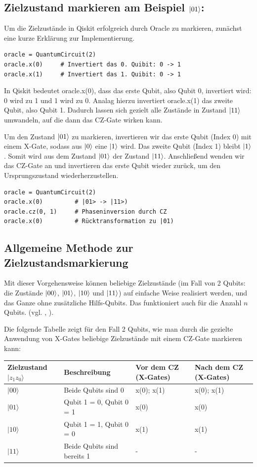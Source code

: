 \subsection*{Zielzustand markieren am Beispiel $\ket{01}$:}
Um die Zielzustände in Qiskit erfolgreich durch Oracle zu markieren, zunächst eine kurze Erklärung zur Implementierung. 
\begin{verbatim}
oracle = QuantumCircuit(2)
oracle.x(0)     # Invertiert das 0. Quibit: 0 -> 1
oracle.x(1)     # Invertiert das 1. Quibit: 0 -> 1
\end{verbatim}
In Qiskit bedeutet oracle.x(0), dass das erste Qubit, also Qubit 0, invertiert wird: 0 wird zu 1 und 1 wird zu 0. Analag hierzu invertiert oracle.x(1) das zweite Qubit, also Qubit 1. Dadurch lassen sich gezielt alle Zustände in Zustand $\ket{11}$ umwandeln, auf die dann das CZ-Gate wirken kann. 


Um den Zustand $\ket{01}$ zu markieren, invertieren wir das erste Qubit (Index 0) mit einem X-Gate, sodass aus $\ket{0}$ eine $\ket{1}$ wird. Das zweite Qubit (Index 1) bleibt $\ket{1}$. Somit wird aus dem Zustand $\ket{01}$ der Zustand $\ket{11}$. Anschließend wenden wir das CZ-Gate an und invertieren das erste Qubit wieder zurück, um den Ursprungszustand wiederherzustellen.
\begin{verbatim}
oracle = QuantumCircuit(2)
oracle.x(0)         # |01> -> |11>)
oracle.cz(0, 1)     # Phaseninversion durch CZ
oracle.x(0)         # Rücktransformation zu |01)
\end{verbatim}

\subsection*{Allgemeine Methode zur Zielzustandsmarkierung}
Mit dieser Vorgehensweise können beliebige Zielzustände (im Fall von 2 Qubits: die Zustände $\ket{00}$, $\ket{01}$, $\ket{10}$ und $\ket{11}$) auf einfache Weise realisiert werden, und das Ganze ohne zusätzliche Hilfs-Qubits. Das funktioniert auch für die Anzahl $n$ Qubits. 
(vgl. \citeauthor{roy_deterministic_2022}, \citeyear{roy_deterministic_2022}). 

Die folgende Tabelle zeigt für den Fall 2  Qubits, wie man durch die gezielte Anwendung von X-Gates beliebige Zielzustände mit einem CZ-Gate markieren kann:

\begin{tabular}{|l|l|l|l|}
\hline
Zielzustand $|z_1 z_0\rangle$ & Beschreibung & Vor dem CZ (X-Gates) & Nach dem CZ (X-Gates) \\
\hline
$|00\rangle$ & Beide Qubits sind 0 & x(0); x(1) & x(0); x(1) \\
\hline
$|01\rangle$ & Qubit 1 = 0, Qubit 0 = 1 & x(0) & x(0) \\
\hline
$|10\rangle$ & Qubit 1 = 1, Qubit 0 = 0 & x(1) & x(1) \\
\hline
$|11\rangle$ & Beide Qubits sind bereits 1 & - & - \\
\hline
\end{tabular}



